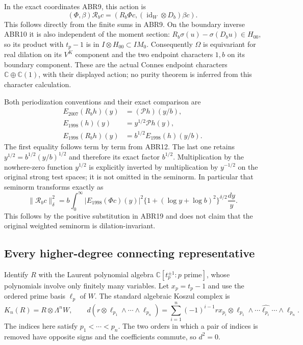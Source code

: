 \documentclass[11pt]{article}
\begin{document}
In the exact coordinates ABR9, this action is
\begin{equation}\tag{ABR19b}
 (\Phi,\beta)\mathscr R_b c
   =\left(R_b\Phi c,
                (\operatorname{id}_W\otimes D_b)\beta c\right).
\end{equation}
This follows directly from the finite sums in ABR9. On the boundary
inverse ABR10 it is also independent of the moment section:
$R_b\sigma(u)-\sigma(D_bu)\in H_{00}$, so its product with
$t_p-1$ is in $I\otimes H_{00}\subset IM_0$. Consequently
$\Omega$ is equivariant for real dilation on its $V^K$ component
and the two endpoint characters $1,b$ on its boundary component.
These are the actual Connes endpoint characters
$\mathbb C\oplus\mathbb C(1)$, with their displayed action;
no purity theorem is inferred from this character calculation.

Both periodization conventions and their exact comparison are
\begin{equation}\tag{ABR19c}
 \begin{split}
 E_{2007}(R_bh)(y)&=(\mathcal P h)(y/b),\\
 E_{1998}(h)(y)&=y^{1/2}\mathcal P h(y),\\
 E_{1998}(R_bh)(y)&=b^{1/2}E_{1998}(h)(y/b).
 \end{split}
\end{equation}
The first equality follows term by term from ABR12. The last one
retains $y^{1/2}=b^{1/2}(y/b)^{1/2}$ and therefore its exact
factor $b^{1/2}$. Multiplication by the nowhere-zero function
$y^{1/2}$ is explicitly inverted by multiplication by $y^{-1/2}$
on the original strong test spaces; it is not omitted in the
seminorm. In particular that seminorm transforms exactly as
\begin{equation}\tag{ABR19d}
 \|\mathscr R_b c\|_\delta^2
   =b\int_0^\infty|E_{1998}(\Phi c)(y)|^2
       \{1+(\log y+\log b)^2\}^{\delta/2}\frac{dy}{y}.
\end{equation}
This follows by the positive substitution in ABR19 and does not
claim that the original weighted seminorm is dilation-invariant.

\subsection{Every higher-degree connecting representative}

Identify $R$ with the Laurent polynomial algebra
$\mathbb C[t_p^{\pm1}:p\text{ prime}]$, whose polynomials involve
only finitely many variables. Let $x_p=t_p-1$ and use the ordered
prime basis $\ell_p$ of $W$. The standard algebraic Koszul complex is
\begin{equation}\tag{ABR20}
 K_n(R)=R\otimes\Lambda^nW,\qquad
 d(r\otimes\ell_{p_1}\wedge\cdots\wedge\ell_{p_n})
  =\sum_{i=1}^n(-1)^{i-1}rx_{p_i}\otimes
       \ell_{p_1}\wedge\cdots\widehat{\ell_{p_i}}\cdots
                              \wedge\ell_{p_n}.
\end{equation}
The indices here satisfy $p_1<\cdots<p_n$. The two orders in
which a pair of indices is removed have opposite signs and
the coefficients commute, so $d^2=0$.
\end{document}
